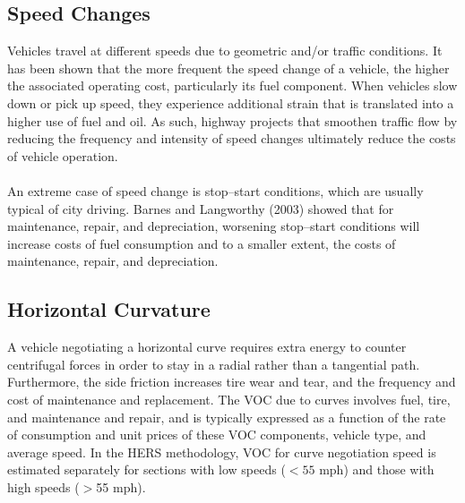 \subsection{Speed Changes}
Vehicles travel at different speeds due to geometric and/or traffic conditions. It has been shown that the more frequent the speed change of a vehicle, the higher the associated operating cost, particularly its fuel component. When vehicles slow down or pick up speed, they experience additional strain that is translated into a higher use of fuel and oil. As such, highway projects that smoothen traffic flow by reducing the frequency and intensity of speed changes ultimately reduce the costs of vehicle operation.\\\\
An extreme case of speed change is stop–start conditions, which are usually typical of city driving. Barnes and Langworthy (2003) showed that for maintenance, repair, and depreciation, worsening stop–start conditions will increase costs of fuel consumption and to a smaller extent, the costs of maintenance, repair, and depreciation.
%
\subsection{Horizontal Curvature}
A vehicle negotiating a horizontal curve requires extra energy to counter centrifugal forces in order to stay in a radial rather than a tangential path. Furthermore, the side friction increases tire wear and tear, and the frequency and cost of maintenance and replacement. The VOC due to curves involves fuel, tire, and maintenance and repair, and is typically expressed as a function of the rate of consumption and unit prices of these VOC components, vehicle type, and average speed. In the HERS methodology, VOC for curve negotiation speed is estimated separately for sections with low speeds ($ <55 $ mph) and those with high speeds ($ > $55 mph).
%
